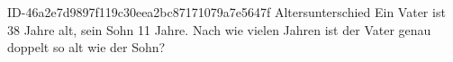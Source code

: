 \begin{exercise}
      {ID-46a2e7d9897f119c30eea2bc87171079a7e5647f}
      {Altersunterschied}
  \ifproblem\problem
    Ein Vater ist 38 Jahre alt, sein Sohn 11 Jahre. Nach wie vielen Jahren ist
    der Vater genau doppelt so alt wie der Sohn?
  \fi
\end{exercise}
